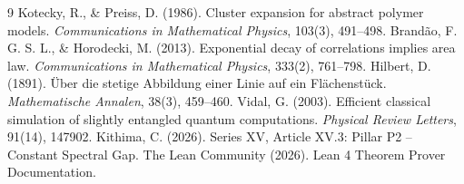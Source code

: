 \documentclass[11pt,a4paper]{article}
\begin{document}

\begin{thebibliography}{9}
  Kotecky, R., \& Preiss, D. (1986). Cluster expansion for abstract polymer models. \emph{Communications in Mathematical Physics}, 103(3), 491–498.
  Brandão, F. G. S. L., \& Horodecki, M. (2013). Exponential decay of correlations implies area law. \emph{Communications in Mathematical Physics}, 333(2), 761–798.
  Hilbert, D. (1891). Über die stetige Abbildung einer Linie auf ein Flächenstück. \emph{Mathematische Annalen}, 38(3), 459–460.
  Vidal, G. (2003). Efficient classical simulation of slightly entangled quantum computations. \emph{Physical Review Letters}, 91(14), 147902.
  Kithima, C. (2026). Series XV, Article XV.3: Pillar P2 – Constant Spectral Gap.
  The Lean Community (2026). Lean 4 Theorem Prover Documentation.
\end{thebibliography}
\end{document}
